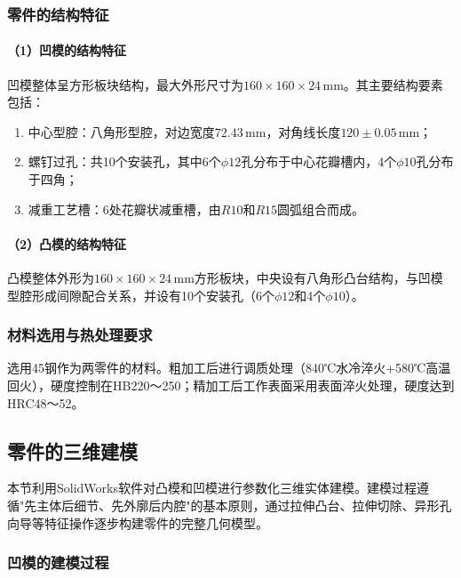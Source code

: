 \documentclass{xautCADreport}
\begin{document}
\subsubsection{零件的结构特征}

\paragraph{（1）凹模的结构特征}

凹模整体呈方形板块结构，最大外形尺寸为$160\times160\times24\,\mathrm{mm}$。其主要结构要素包括：
\begin{enumerate}
  \item 中心型腔：八角形型腔，对边宽度$72.43\,\mathrm{mm}$，对角线长度$120\pm0.05\,\mathrm{mm}$；
  \item 螺钉过孔：共10个安装孔，其中6个$\phi12$孔分布于中心花瓣槽内，4个$\phi10$孔分布于四角；
  \item 减重工艺槽：6处花瓣状减重槽，由$R10$和$R15$圆弧组合而成。
\end{enumerate}

\paragraph{（2）凸模的结构特征}

凸模整体外形为$160\times160\times24\,\mathrm{mm}$方形板块，中央设有八角形凸台结构，与凹模型腔形成间隙配合关系，并设有10个安装孔（6个$\phi12$和4个$\phi10$）。

\subsubsection{材料选用与热处理要求}

选用45钢作为两零件的材料。粗加工后进行调质处理（840℃水冷淬火+580℃高温回火），硬度控制在HB220～250；精加工后工作表面采用表面淬火处理，硬度达到HRC48～52。

\subsection{零件的三维建模}

本节利用SolidWorks软件对凸模和凹模进行参数化三维实体建模。建模过程遵循"先主体后细节、先外廓后内腔"的基本原则，通过拉伸凸台、拉伸切除、异形孔向导等特征操作逐步构建零件的完整几何模型。

\subsubsection{凹模的建模过程}
\end{document}
